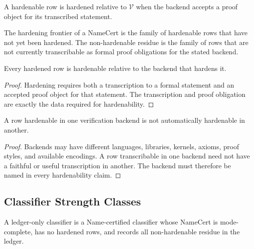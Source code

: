 \begin{definition}
\label{def:philosophy-hardened-row}
A hardenable row is hardened relative to $\mathcal{V}$ when the backend
accepts a proof object for its transcribed statement.
\end{definition}

\begin{definition}
\label{def:philosophy-hardening-frontier}
The hardening frontier of a NameCert is the family of hardenable rows
that have not yet been hardened. The non-hardenable residue is the
family of rows that are not currently transcribable as formal proof
obligations for the stated backend.
\end{definition}

\begin{theorem}
\label{thm:philosophy-hardened-implies-hardenable}
Every hardened row is hardenable relative to the backend that hardens it.
\end{theorem}
\begin{proof}
Hardening requires both a transcription to a formal statement and an
accepted proof object for that statement. The transcription and proof
obligation are exactly the data required for hardenability.
\end{proof}

\begin{theorem}
\label{thm:philosophy-hardenability-backend-relative}
A row hardenable in one verification backend is not automatically
hardenable in another.
\end{theorem}
\begin{proof}
Backends may have different languages, libraries, kernels, axioms, proof
styles, and available encodings. A row transcribable in one backend need
not have a faithful or useful transcription in another. The backend must
therefore be named in every hardenability claim.
\end{proof}

\subsection{Classifier Strength Classes}
\label{subsec:philosophy-classifier-strength-classes}

\begin{definition}
\label{def:philosophy-ledger-only-classifier}
A ledger-only classifier is a Name-certified classifier whose NameCert is
mode-complete, has no hardened rows, and records all non-hardenable
residue in the ledger.
\end{definition}

